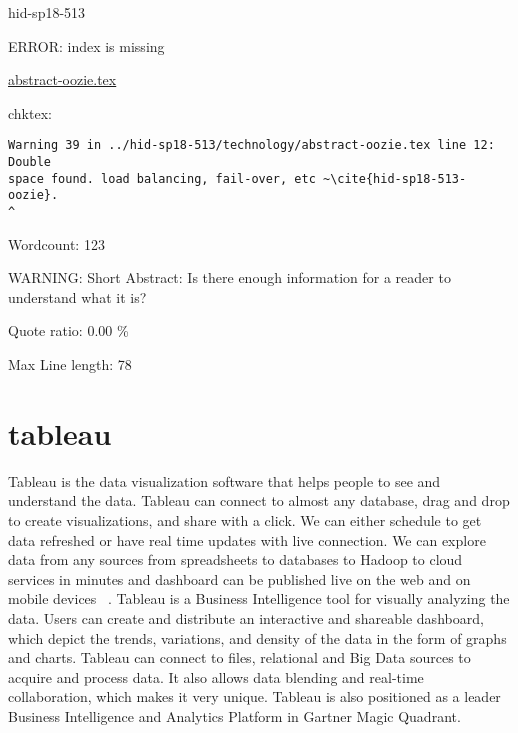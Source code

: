 \begin{IU}

hid-sp18-513

ERROR: index is missing

\href{https://github.com/cloudmesh-community/hid-sp18-513/blob/master//technology/abstract-oozie.tex}{abstract-oozie.tex}

 
chktex:
\begin{tiny}
\begin{verbatim}
Warning 39 in ../hid-sp18-513/technology/abstract-oozie.tex line 12: Double
space found. load balancing, fail-over, etc ~\cite{hid-sp18-513-oozie}.
^
\end{verbatim}
\end{tiny}

Wordcount: 123

WARNING: Short Abstract: Is there enough information for a reader to understand what it is?


Quote ratio: 0.00 \%
 
Max Line length: 78
\end{IU}

\section{tableau}

Tableau is the data visualization software that helps people to see and 
understand the data. Tableau can connect to almost any database, drag and drop
to create visualizations, and share with a click. We can either schedule to get
data refreshed or have real time updates with live connection.  We can explore
data from any sources from spreadsheets to databases to Hadoop to cloud 
services in minutes and  dashboard can be published live on the web and on
mobile devices ~\cite{hid-sp18-513-tableau}. Tableau is a Business Intelligence 
tool for visually analyzing the data. Users can create and distribute an 
interactive and shareable dashboard, which depict the trends, variations, and
density of the data in the form of graphs and charts. Tableau can connect to 
files, relational and Big Data sources to acquire and process data. It also
allows data blending and real-time collaboration, which makes it very unique. 
Tableau is also positioned as a leader Business Intelligence and Analytics 
Platform in Gartner Magic Quadrant.


